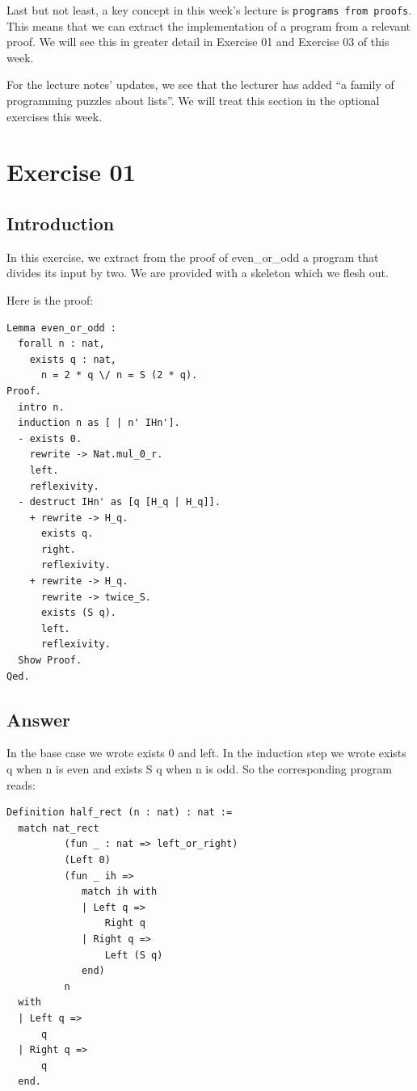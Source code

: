 \documentclass{article}
\begin{document}
Last but not least, a key concept in this week's lecture is \texttt{programs from proofs}. This means that we can extract the implementation of a program from a relevant proof. We will see this in greater detail in Exercise 01 and Exercise 03 of this week. 

For the lecture notes' updates, we see that the lecturer has added ``a family of programming puzzles about lists''. We will treat this section in the optional exercises this week. 

\section{Exercise 01}

\subsection{Introduction}
In this exercise, we extract from the proof of even\_or\_odd a program that divides its input by two. We are provided with a skeleton which we flesh out.

Here is the proof:

\begin{lstlisting}
Lemma even_or_odd :
  forall n : nat,
    exists q : nat,
      n = 2 * q \/ n = S (2 * q).
Proof.
  intro n.
  induction n as [ | n' IHn'].
  - exists 0.
    rewrite -> Nat.mul_0_r.
    left.
    reflexivity.
  - destruct IHn' as [q [H_q | H_q]].
    + rewrite -> H_q.
      exists q.
      right.
      reflexivity.
    + rewrite -> H_q.
      rewrite -> twice_S.
      exists (S q).
      left.
      reflexivity.
  Show Proof.
Qed.
\end{lstlisting}

\subsection{Answer}
 
In the base case we wrote exists 0 and left. In the induction step we wrote exists q when n is even and exists S q when n is odd. So the corresponding program reads:

\begin{lstlisting}
Definition half_rect (n : nat) : nat :=
  match nat_rect
          (fun _ : nat => left_or_right)  
          (Left 0)                        
          (fun _ ih =>                   
             match ih with
             | Left q =>
                 Right q          
             | Right q =>
                 Left (S q)      
             end)
          n
  with
  | Left q =>
      q
  | Right q =>
      q
  end.
\end{lstlisting}
\end{document}

